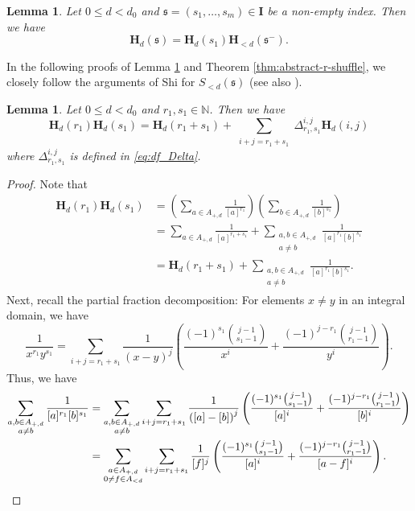 \documentclass[12pt,reqno]{amsart}
\numberwithin{equation}{section}
\theoremstyle{plain}
\newtheorem{lem}[thm]{Lemma}
\theoremstyle{definition}
\theoremstyle{remark}
\newcommand{\NN}{\mathbb{N}}
\newcommand{\ww}[1]{\mathfrak{#1}}
\renewcommand{\H}{\mathbf{H}}
\newcommand{\Ical}{\mathbf{I}}
\begin{document}
\begin{lem}\label{lem:d=d product <d}
     Let $0\leq d<d_0$ and $\ww{s}=(s_1,\ldots,s_m)\in\Ical$ be a non-empty index.  Then we have
    $$\H_{d}(\ww{s})=\H_{d}(s_1)\H_{<d}(\ww{s}^-).$$
\end{lem}
In the following proofs of Lemma \ref{lem:shuffle base} and Theorem \ref{thm:abstract-r-shuffle}, we closely follow the arguments of Shi \cite[Theorem 3.1.4]{Shi2018} for $S_{<d}(\ww{s})$ (see also \cite{Thakur2010}).
\begin{lem}\label{lem:shuffle base}
     Let $0\leq d< d_0$ and $r_1,s_1\in\NN$. Then we have
    $$\H_{d}(r_1)\H_{d}(s_1)=\H_{d}(r_1+s_1)+\sum_{\substack{i+j=r_1+s_1}}\Delta_{r_1,s_1}^{i,j} \H_{d}(i,j)$$
    where
    $\Delta_{r_1,s_1}^{i,j}$ is defined in \eqref{eq:df_Delta}.
\end{lem}
\begin{proof}
    Note that 
    \begin{align*}
        \H_{d}(r_1)\H_{d}(s_1)&= \left(\sum_{a\in A_{+,d}}\frac{1}{[a]^{r_1}}\right)\left(\sum_{b\in A_{+,d}}\frac{1}{[b]^{s_1}}\right)
        \\
        &= \sum_{a\in A_{+,d}}\frac{1}{[a]^{r_1+s_1}}+\sum_{\substack{a,b\in A_{+,d}\\a\neq b}}\frac{1}{[a]^{r_1}[b]^{s_1}}
        \\
        &= \H_{d}(r_1+s_1)+\sum_{\substack{a,b\in A_{+,d}\\a\neq b}}\frac{1}{[a]^{r_1}[b]^{s_1}}.
    \end{align*}
    Next, recall the partial fraction decomposition: For elements $x\neq y$ in an integral domain, we have
    $$\frac{1}{x^{r_1}y^{s_1}}=\sum_{i+j=r_1+s_1}\frac{1}{(x-y)^j}\left(\frac{(-1)^{s_1}\binom{j-1}{s_1-1}}{x^i}+\frac{(-1)^{j-r_1}\binom{j-1}{r_1-1}}{y^i}\right).$$
    Thus, we have
    \begin{align}
        \notag\sum_{\substack{a,b\in A_{+,d}\\a\neq b}}\frac{1}{[a]^{r_1}[b]^{s_1}}&=\sum_{\substack{a,b\in A_{+,d}\\a\neq b}}\sum_{i+j=r_1+s_1}\frac{1}{\left([a]-[b]\right)^j}\left(\frac{(-1)^{s_1}\binom{j-1}{s_1-1}}{[a]^i}+\frac{(-1)^{j-r_1}\binom{j-1}{r_1-1}}{[b]^i}\right)
        \\\label{eq:shuffle1}&=\sum_{\substack{a\in A_{+,d}\\ 0\neq f\in A_{<d}}}\sum_{i+j=r_1+s_1}\frac{1}{[f]^j}\left(\frac{(-1)^{s_1}\binom{j-1}{s_1-1}}{[a]^i}+\frac{(-1)^{j-r_1}\binom{j-1}{r_1-1}}{[a-f]^i}\right).
    \end{align}

\end{proof}
\end{document}
